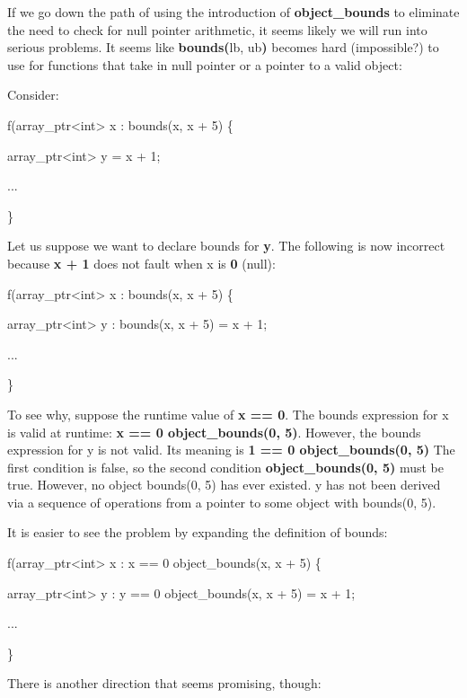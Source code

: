 \documentclass[]{article}
\begin{document}
If we go down the path of using the introduction of
\textbf{object\_bounds} to eliminate the need to check for null pointer
arithmetic, it seems likely we will run into serious problems. It seems
like \textbf{bounds(}lb, ub\textbf{)} becomes hard (impossible?) to use
for functions that take in null pointer or a pointer to a valid object:

Consider:

f(array\_ptr\textless{}int\textgreater{} x : bounds(x, x + 5) \{

array\_ptr\textless{}int\textgreater{} y = x + 1;

...

\}

Let us suppose we want to declare bounds for \textbf{y}. The following
is now incorrect because \textbf{x + 1} does not fault when x is
\textbf{0} (null):

f(array\_ptr\textless{}int\textgreater{} x : bounds(x, x + 5) \{

array\_ptr\textless{}int\textgreater{} y : bounds(x, x + 5) = x + 1;

...

\}

To see why, suppose the runtime value of \textbf{x == 0}. The bounds
expression for x is valid at runtime: \textbf{x == 0
\textbar{}\textbar{} object\_bounds(0, 5)}. However, the bounds
expression for y is not valid. Its meaning is \textbf{1 == 0
\textbar{}\textbar{} object\_bounds(0, 5)} The first condition is false,
so the second condition \textbf{object\_bounds(0, 5)} must be true.
However, no object bounds(0, 5) has ever existed. y has not been derived
via a sequence of operations from a pointer to some object with
bounds(0, 5).

It is easier to see the problem by expanding the definition of bounds:

f(array\_ptr\textless{}int\textgreater{} x : x == 0 \textbar{}\textbar{}
object\_bounds(x, x + 5) \{

array\_ptr\textless{}int\textgreater{} y : y == 0 \textbar{}\textbar{}
object\_bounds(x, x + 5) = x + 1;

...

\}

There is another direction that seems promising, though:
\end{document}
